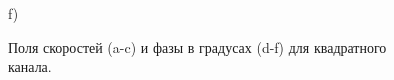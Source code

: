 \documentclass[a4paper,12pt]{article}
\theoremstyle{plain} %
\theoremstyle{definition} %
\theoremstyle{remark} %
\begin{document}
\begin{figure}[H]
\begin{minipage}[h]{0.47\linewidth}
\end{minipage}
\hfill
\begin{minipage}[h]{0.47\linewidth}
 \small f) \\
\end{minipage}
\caption{Поля скоростей (a-c) и фазы в градусах (d-f) для квадратного канала.}
\end{figure}
\end{document}

